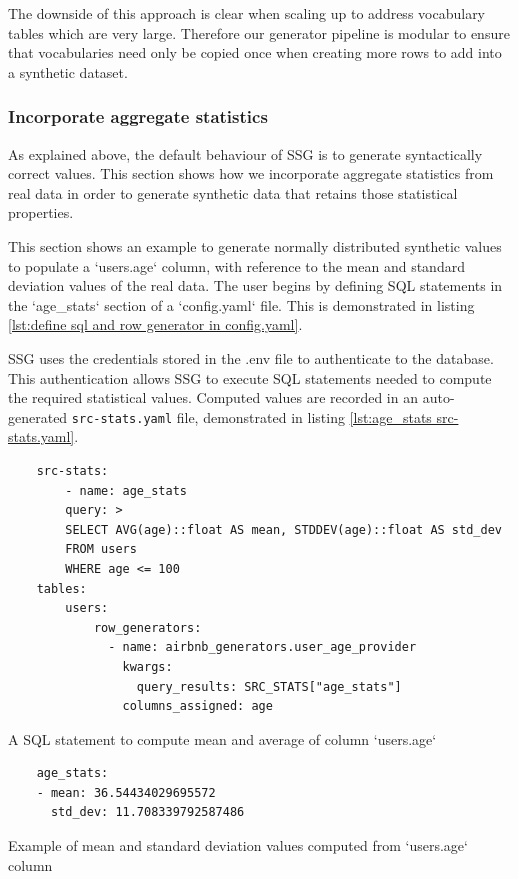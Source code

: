 \documentclass[11pt]{article}
\begin{document}
The downside of this approach is clear when scaling up to address vocabulary tables which are very large. Therefore our generator pipeline is modular to ensure that vocabularies need only be copied once when creating more rows to add into a synthetic dataset. 

\subsubsection{Incorporate aggregate statistics}

As explained above, the default behaviour of SSG is to generate syntactically correct values. This section shows how we incorporate aggregate statistics from real data in order to generate synthetic data that retains those statistical properties. 

This section shows an example to generate normally distributed synthetic values to populate a `users.age` column, with reference to the mean and standard deviation values of the real data. The user begins by defining SQL statements in the `age\_stats` section of a `config.yaml` file. This is demonstrated in listing \ref{lst:define sql and row generator in config.yaml}. 

SSG uses the credentials stored in the .env file to authenticate to the database. This authentication allows SSG to execute SQL statements needed to compute the required statistical values. Computed values are recorded in an auto-generated \texttt{src-stats.yaml} file, demonstrated in listing \ref{lst:age_stats src-stats.yaml}. 

\begin{listing}[H]
\begin{verbatim}
    src-stats:
        - name: age_stats
        query: >
        SELECT AVG(age)::float AS mean, STDDEV(age)::float AS std_dev
        FROM users
        WHERE age <= 100
    tables:
        users:
            row_generators:
              - name: airbnb_generators.user_age_provider
                kwargs:
                  query_results: SRC_STATS["age_stats"]
                columns_assigned: age
\end{verbatim}
\caption{A SQL statement to compute mean and average of column `users.age` }
\label{lst:define sql and row generator in config.yaml}
\end{listing}

\begin{listing}[H]
\begin{verbatim}
    age_stats:
    - mean: 36.54434029695572
      std_dev: 11.708339792587486
\end{verbatim}
\caption{Example of mean and standard deviation values computed from `users.age` column}
\label{lst:age_stats src-stats.yaml}
\end{listing}
\end{document}
